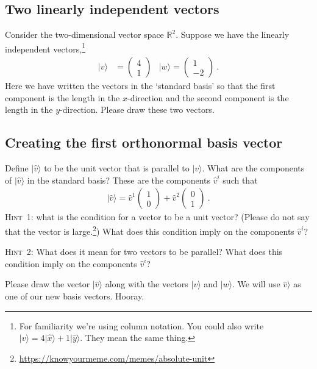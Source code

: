 \documentclass[12pt]{article}
\numberwithin{equation}{section}    %
\begin{document}
\subsection{Two linearly independent vectors}

Consider the two-dimensional vector space $\mathbb{R}^2.$ Suppose we have the linearly independent vectors,\footnote{For familiarity we're using column notation. You could also write $|v\rangle = 4|\hat{x}\rangle + 1|\hat{y}\rangle$. They mean the same thing.}
\begin{align}
	|v\rangle &= 
	\begin{pmatrix}
		4\\1
	\end{pmatrix}
	&
	|w\rangle = 
	\begin{pmatrix}
		1\\-2
	\end{pmatrix} \ .
\end{align}
Here we have written the vectors in the `standard basis' so that the first component is the length in the $x$-direction and the second component is the length in the $y$-direction. Please draw these two vectors.

\subsection{Creating the first orthonormal basis vector}\label{sec:orthonormal}
Define $|\hat{v}\rangle$ to be the unit vector that is parallel to $|v\rangle$. What are the components of $|\hat{v}\rangle$ in the standard basis? These are the components $\hat v^i$ such that
\begin{align}
	|\hat v\rangle = 
	\hat v^1 
	\begin{pmatrix}
	1 \\ 0	
	\end{pmatrix}
	+ 
	\hat v^2 
	\begin{pmatrix}
	0 \\ 1
	\end{pmatrix} \ .
\end{align}
\textsc{Hint~1}: what is the condition for a vector to be a unit vector? (Please do not say that the vector is large.\footnote{\url{https://knowyourmeme.com/memes/absolute-unit}}) What does this condition imply on the components $\hat v^i$? 

\textsc{Hint~2}: What does it mean for two vectors to be parallel? What does this condition imply on the components $\hat v^i$? 

Please draw the vector $|\hat v\rangle$ along with the vectors $|v\rangle$ and $|w \rangle$. We will use $\hat v\rangle$ as one of our new basis vectors. Hooray.
\end{document}
